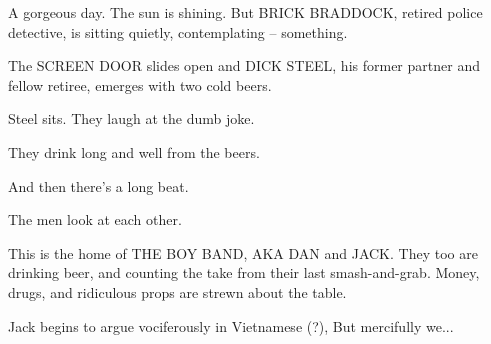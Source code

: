 \documentclass{bubbler}
\begin{document}
\begin{script}

\contop




A gorgeous day.  The sun is shining.  But BRICK BRADDOCK, retired police detective, is sitting quietly, contemplating -- something.

The SCREEN DOOR slides open and DICK STEEL, his former partner and fellow retiree, emerges with two cold beers.




Steel sits.  They laugh at the dumb joke.



They drink long and well from the beers.

And then there's a long beat.


The men look at each other.




This is the home of THE BOY BAND, AKA DAN and JACK.  They too are drinking beer, and counting the take from their last smash-and-grab.  Money, drugs, and ridiculous props are strewn about the table.

\begin{comment}
It was supposed to be Vietnamese, right?
\end{comment}


Jack begins to argue vociferously in Vietnamese (?), But mercifully we...




\end{script}
\end{document}
